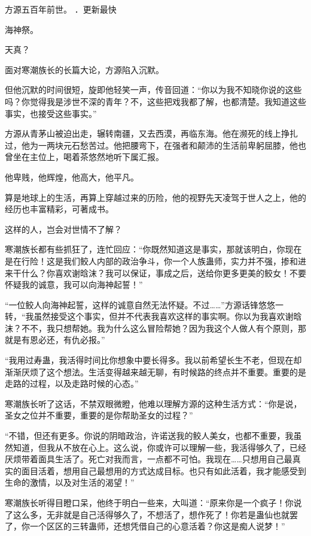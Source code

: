 
\begin{this_body}

方源五百年前世。 ．更新最快

海神祭。

天真？

面对寒潮族长的长篇大论，方源陷入沉默。

但他沉默的时间很短，旋即他轻笑一声，传音回道：“你以为我不知晓你说的这些吗？你觉得我是涉世不深的青年？不，这些把戏我都了解，也都清楚。我知道这些事实，也接受这些事实。”

方源从青茅山被迫出走，辗转南疆，又去西漠，再临东海。他在濒死的线上挣扎过，他为一两块元石愁苦过。他把腰弯下，在强者和颠沛的生活前卑躬屈膝，他也曾坐在主位上，喝着茶悠然地听下属汇报。

他卑贱，他辉煌，他高大，他平凡。

算是地球上的生活，再算上穿越过来的历险，他的视野先天凌驾于世人之上，他的经历也丰富精彩，可著成书。

这样的人，岂会对世情不了解？

寒潮族长都有些抓狂了，连忙回应：“你既然知道这是事实，那就该明白，你现在是在行险！这是我们鲛人内部的政治争斗，你一个人族蛊师，实力并不强，掺和进来干什么？你喜欢谢晗沫？我可以保证，事成之后，送给你更多更美的鲛女！不要怀疑我的诚意，我可以向海神起誓！”

“一位鲛人向海神起誓，这样的诚意自然无法怀疑。不过……”方源话锋悠悠一转，“我虽然接受这个事实，但并不代表我喜欢这样的事实啊。你以为我喜欢谢晗沫？不不，我只想帮她。我为什么这么冒险帮她？因为我这个人做人有个原则，那就是有恩必还，有仇必报。”

“我用过寿蛊，我活得时间比你想象中要长得多。我以前希望长生不老，但现在却渐渐厌烦了这个想法。生活变得越来越无聊，有时候路的终点并不重要。重要的是走路的过程，以及走路时候的心态。”

寒潮族长听了这话，不禁双眼微瞪，他难以理解方源的这种生活方式：“你是说，圣女之位并不重要，重要的是你帮助圣女的过程？”

“不错，但还有更多。你说的阴暗政治，许诺送我的鲛人美女，也都不重要，我虽然知道，但我从不放在心上。这么说，你或许可以理解一些，我活得够久了，已经厌烦带着面具生活了。死亡对我而言，一点都不可怕。我现在……只想用自己最真实的面目活着，想用自己最想用的方式达成目标。也只有如此活着，我才能感受到生命的激情，以及对生活的渴望！”

寒潮族长听得目瞪口呆，他终于明白一些来，大叫道：“原来你是一个疯子！你说了这么多，无非就是自己活得够久了，不想活了，想作死了！你若是蛊仙也就罢了，你一个区区的三转蛊师，还想凭借自己的心意活着？你这是痴人说梦！”


\end{this_body}
